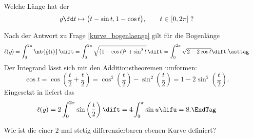   \begin{frage}
    Welche Länge hat der  
    \[
    \varrho\fd t \mapsto 
    \big( t-\sin t,  1-\cos t \big), \qquad t\in[0,2\pi]\;
    \text{?} 
    \]
  \end{frage}

  \begin{antwort}
    Nach der Antwort zu Frage \ref{kurve_bogenlaenge} gilt für die Bogenlänge
    \[
    \ell(\varrho)=
    \int_0^{2\pi} \nb{\dot{\varrho}(t) }\, \dift = 
    \int_0^{2\pi} \sqrt{(1- \cos t)^2 + \sin^2 t}\, \dift = 
    \int_0^{2\pi} \sqrt{2-2\cos t} \dift. \asttag
    \]
    Der Integrand lässt sich mit den Additionstheoremen umformen: 
    \[
    \cos t = \cos \left( \frac{t}{2} + \frac{t}{2} \right) = 
    \cos^2 \left( \frac{t}{2} \right) - 
    \sin^2 \left( \frac{t}{2} \right) = 
    1-2 \sin^2 \left( \frac{t}{2} \right). 
    \]
    Eingesetzt in {\astref} liefert das 
    \[
    \ell(\varrho) = 2 \int_0^{2\pi} \sin \left(\frac{t}{2}\right)\dift = 
    4\int_0^{\pi} \sin u \difu =8. \EndTag
    \]
  \end{antwort} 

  \begin{frage}
    Wie ist die  einer $2$-mal stetig differenzierbaren 
    ebenen Kurve definiert?
  \end{frage}

